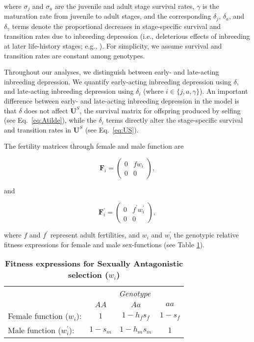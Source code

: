 \documentclass[11pt]{article}
\def\mbf#1{\mathbf{#1}}
\begin{document}
\noindent where $\sigma_j$ and $\sigma_a$ are the juvenile and adult stage survival rates, $\gamma$ is the maturation rate from juvenile to adult stages, and the corresponding $\delta_j$, $\delta_a$, and $\delta_{\gamma}$ terms denote the proportional decreases in stage-specific survival and transition rates due to inbreeding depression (i.e., deleterious effects of inbreeding at later life-history stages; e.g., \citealt{HarderRoutely2006}). For simplicity, we assume survival and transition rates are constant among genotypes. 

Throughout our analyses, we distinguish between early- and late-acting inbreeding depression. We quantify early-acting inbreeding depression using $\delta$, and late-acting inbreeding depression using $\delta_i$ (where $i \in \{j,a,\gamma\}$). An important difference between early- and late-acting inbreeding depression in the model is that $\delta$ does not affect $\mbf{U}^S$, the survival matrix for offspring produced by selfing (see Eq.~\ref{eq:Atilde}), while the $\delta_i$ terms directly alter the stage-specific survival and transition rates in $\mbf{U}^S$ (see Eq.~\ref{eq:US}).

The fertility matrices through female and male function are
\begin{linenomath*}
\begin{equation}\label{eq:FS}
	\mbf{F}_{i} = \left(
					\begin{array}{cc}
						0 & f w_{i} \\
						0 & 0
					\end{array}
				\right),
\end{equation}
\end{linenomath*}
\noindent and
\begin{linenomath*}
\begin{equation}\label{eq:FX}
	\mbf{F}^{\prime}_{i} = \left(
					\begin{array}{cc}
						0 & f^{\prime} w^{\prime}_{i} \\
						0 & 0
					\end{array}
				\right),
\end{equation}
\end{linenomath*}

\noindent where $f$ and $f^{\prime}$ represent adult fertilities, and $w_{i}$ and $w^{\prime}_{i}$ the genotypic relative fitness expressions for female and male sex-functions (see Table \ref{tab:Fitness}). 

\begin{table}[htbp]
 \centering
 \caption{\bf Fitness expressions for Sexually Antagonistic selection ($w_{i}$)}
\label{tab:Fitness}
\begin{tabular}{lccc}
 \toprule
					&  \multicolumn{3}{c}{{\textit{Genotype}}} \\ 
\cline{2-4}
					& $AA$			& $Aa$ 					& $aa$ 		\\ \hline
Female function ($w_{i}$):	& $1$		& $1 - h_f s_f$	& $1 - s_f$ \\	
Male function ($w^{\prime}_{i}$):		& $1 - s_m$& $1 - h_m s_m$	& $1$ 		\\	
\hline
\end{tabular}
\end{table}
\end{document}
